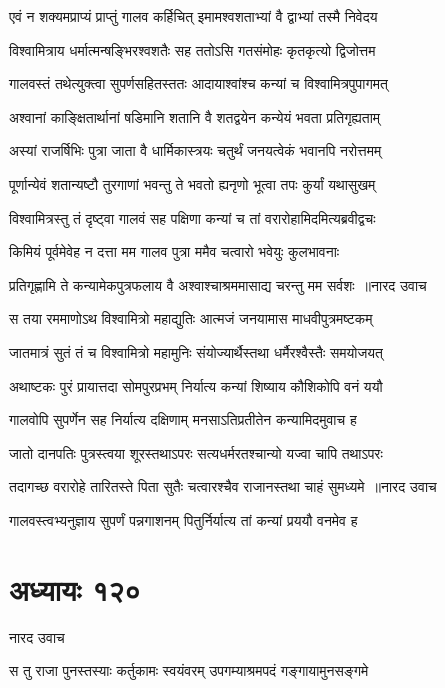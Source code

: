 \twolineshloka
{एवं न शक्यमप्राप्यं प्राप्तुं गालव कर्हिचित्}
{इमामश्वशताभ्यां वै द्वाभ्यां तस्मै निवेदय}


\twolineshloka
{विश्वामित्राय धर्मात्मन्षङ्भिरश्वशतैः सह}
{ततोऽसि गतसंमोहः कृतकृत्यो द्विजोत्तम}


\twolineshloka
{गालवस्तं तथेत्युक्त्वा सुपर्णसहितस्ततः}
{आदायाश्वांश्च कन्यां च विश्वामित्रपुपागमत्}


\twolineshloka
{अश्वानां काङ्क्षितार्थानां षडिमानि शतानि वै}
{शतद्वयेन कन्येयं भवता प्रतिगृह्यताम्}


\twolineshloka
{अस्यां राजर्षिभिः पुत्रा जाता वै धार्मिकास्त्रयः}
{चतुर्थं जनयत्वेकं भवानपि नरोत्तमम्}


\twolineshloka
{पूर्णान्येवं शतान्यष्टौ तुरगाणां भवन्तु ते}
{भवतो ह्यनृणो भूत्वा तपः कुर्यां यथासुखम्}


\twolineshloka
{विश्वामित्रस्तु तं दृष्ट्वा गालवं सह पक्षिणा}
{कन्यां च तां वरारोहामिदमित्यब्रवीद्वचः}


\twolineshloka
{किमियं पूर्वमेवेह न दत्ता मम गालव}
{पुत्रा ममैव चत्वारो भवेयुः कुलभावनाः}


\threelineshloka
{प्रतिगृह्णामि ते कन्यामेकपुत्रफलाय वै}
{अश्वाश्चाश्रममासाद्य चरन्तु मम सर्वशः ॥नारद उवाच}
{}


\twolineshloka
{स तया रममाणोऽथ विश्वामित्रो महाद्युतिः}
{आत्मजं जनयामास माधवीपुत्रमष्टकम्}


\twolineshloka
{जातमात्रं सुतं तं च विश्वामित्रो महामुनिः}
{संयोज्यार्थैस्तथा धर्मैरश्वैस्तैः समयोजयत्}


\twolineshloka
{अथाष्टकः पुरं प्रायात्तदा सोमपुरप्रभम्}
{निर्यात्य कन्यां शिष्याय कौशिकोपि वनं ययौ}


\twolineshloka
{गालवोपि सुपर्णेन सह निर्यात्य दक्षिणाम्}
{मनसाऽतिप्रतीतेन कन्यामिदमुवाच ह}


\twolineshloka
{जातो दानपतिः पुत्रस्त्वया शूरस्तथाऽपरः}
{सत्यधर्मरतश्चान्यो यज्वा चापि तथाऽपरः}


\threelineshloka
{तदागच्छ वरारोहे तारितस्ते पिता सुतैः}
{चत्वारश्चैव राजानस्तथा चाहं सुमध्यमे ॥नारद उवाच}
{}


\twolineshloka
{गालवस्त्वभ्यनुज्ञाय सुपर्णं पन्नगाशनम्}
{पितुर्निर्यात्य तां कन्यां प्रययौ वनमेव ह}


\chapter{अध्यायः १२०}
\twolineshloka
{नारद उवाच}
{}


\twolineshloka
{स तु राजा पुनस्तस्याः कर्तुकामः स्वयंवरम्}
{उपगम्याश्रमपदं गङ्गायामुनसङ्गमे}


